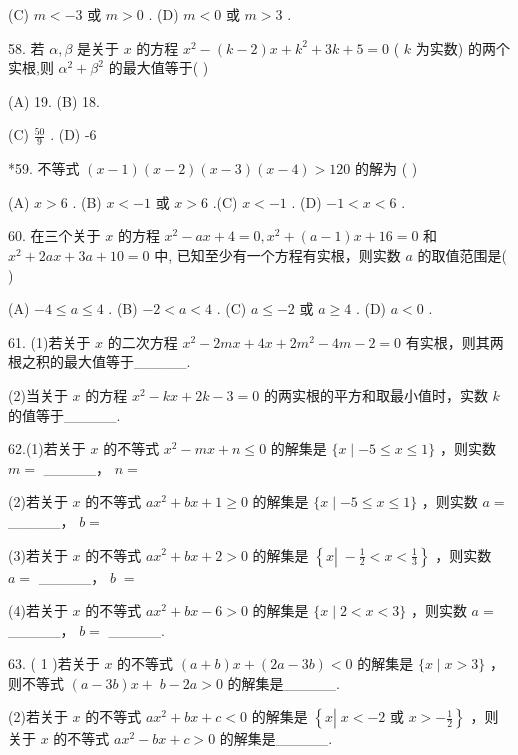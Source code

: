 \documentclass[10pt]{article}
\begin{document}
(C) \(m <  - 3\) 或 \(m > 0\) . (D) \(m < 0\) 或 \(m > 3\) .

58. 若 \(\alpha ,\beta\) 是关于 \(x\) 的方程 \({x}^{2} - \left( {k - 2}\right) x + {k}^{2} + {3k} + 5 = 0\) ( \(k\) 为实数) 的两个实根,则 \({\alpha }^{2} + {\beta }^{2}\) 的最大值等于( )

(A) 19. (B) 18.

(C) \(\frac{50}{9}\) . (D) -6

*59. 不等式 \(\left( {x - 1}\right) \left( {x - 2}\right) \left( {x - 3}\right) \left( {x - 4}\right)  > {120}\) 的解为 ( )

(A) \(x > 6\) . (B) \(x <  - 1\) 或 \(x > 6\) .(C) \(x <  - 1\) . (D) \(- 1 < x < 6\) .

60. 在三个关于 \(x\) 的方程 \({x}^{2} - {ax} + 4 = 0,{x}^{2} + \left( {a - 1}\right) x + {16} = 0\) 和 \({x}^{2} + {2ax} + {3a} + {10} = 0\) 中, 已知至少有一个方程有实根，则实数 \(a\) 的取值范围是( )

(A) \(- 4 \leq  a \leq  4\) . (B) \(- 2 < a < 4\) . (C) \(a \leq   - 2\) 或 \(a \geq  4\) . (D) \(a < 0\) .

61. (1)若关于 \(x\) 的二次方程 \({x}^{2} - {2mx} + {4x} + 2{m}^{2} - {4m} - 2 = 0\) 有实根，则其两根之积的最大值等于\_\_\_\_\_.

(2)当关于 \(x\) 的方程 \({x}^{2} - {kx} + {2k} - 3 = 0\) 的两实根的平方和取最小值时，实数 \(k\) 的值等于\_\_\_\_\_.

62.(1)若关于 \(x\) 的不等式 \({x}^{2} - {mx} + n \leq  0\) 的解集是 \(\{ x \mid   - 5 \leq  x \leq  1\}\) ，则实数 \(m =\) \_\_\_\_\_， \(n =\)

(2)若关于 \(x\) 的不等式 \(a{x}^{2} + {bx} + 1 \geq  0\) 的解集是 \(\{ x \mid   - 5 \leq  x \leq  1\}\) ，则实数 \(a =\) \_\_\_\_\_， \(b =\)

(3)若关于 \(x\) 的不等式 \(a{x}^{2} + {bx} + 2 > 0\) 的解集是 \(\left\{  {x\left| {\; - \frac{1}{2} < x < \frac{1}{3}}\right. }\right\}\) ，则实数 \(a =\) \_\_\_\_\_， \(b \; =\)

(4)若关于 \(x\) 的不等式 \(a{x}^{2} + {bx} - 6 > 0\) 的解集是 \(\{ x \mid  2 < x < 3\}\) ，则实数 \(a =\) \_\_\_\_\_， \(b =\) \_\_\_\_\_.

63. ( 1 )若关于 \(x\) 的不等式 \(\left( {a + b}\right) x + \left( {{2a} - {3b}}\right)  < 0\) 的解集是 \(\{ x \mid  x > 3\}\) ，则不等式 \(\left( {a - {3b}}\right) x + \; b - {2a} > 0\) 的解集是\_\_\_\_\_.

(2)若关于 \(x\) 的不等式 \(a{x}^{2} + {bx} + c < 0\) 的解集是 \(\left\{  {x\left| {\;x <  - 2\text{ 或 }x >  - \frac{1}{2}}\right. }\right\}\) ，则关于 \(x\) 的不等式 \(a{x}^{2} - {bx} + c > 0\) 的解集是\_\_\_\_\_.
\end{document}
